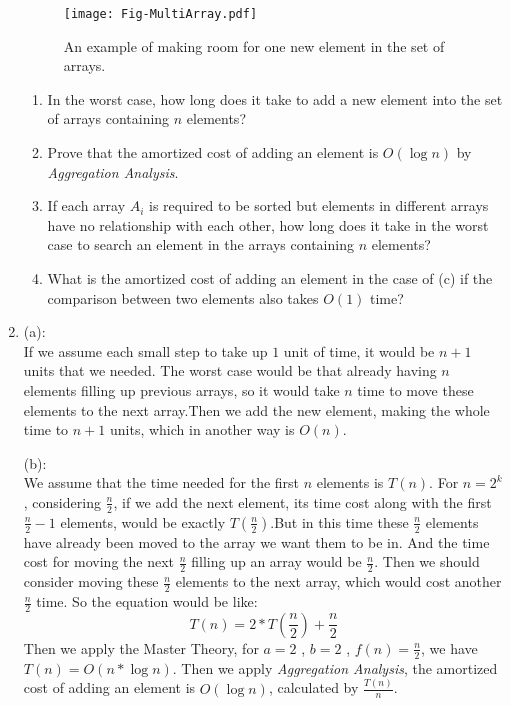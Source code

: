 \documentclass[12pt,a4paper]{article}
\makeatletter
\newtheorem*{solution}{Solution}
\theoremstyle{definition}
\renewenvironment{solution}[1][Solution] {\par\pushQED{\qed}\normalfont\topsep6\p@\@plus6\p@\relax\trivlist\item[\hskip\labelsep\bfseries#1\@addpunct{.}]\ignorespaces}{\popQED\endtrivlist\@endpefalse} \makeatother
\makeatother
\begin{document}
\begin{enumerate}
	\begin{figure}[!htbp]
	\centering
	\texttt{[image: Fig-MultiArray.pdf]}
	\caption{An example of making room for one new element in the set of arrays.}
	\label{Fig-MultiArray}
	\end{figure}

    \begin{enumerate}
        \item In the worst case, how long does it take to add a new element into the set of arrays containing $n$ elements?
        \item Prove that the amortized cost of adding an element is $O(\log n)$ by \emph{Aggregation Analysis}.
        \item If each array $A_i$ is required to be sorted but elements in different arrays have no relationship with each other, how long does it take in the worst case to search an element in the arrays containing $n$ elements? 
\item What is the amortized cost of adding an element in the case of (c) if the comparison between two elements also takes $O(1)$ time?
    \end{enumerate}
	
	\begin{solution}
	(a):\\
	If we assume each small step to take up $1$ unit of time, it would be $n+1$ units that we needed. The worst case would be that already having $n$ elements filling up previous arrays, so it would take $n$ time to move these elements to the next array.Then we add the new element, making the whole time to $n+1$ units, which in another way is $O\left(n\right)$.
	
	
	(b):\\
	We assume that the time needed for the first $n$ elements is $T\left(n\right)$. For $n=2^k$, considering $\frac{n}{2}$, if we add the next element, its time cost along with the first $\frac{n}{2} -1$ elements,  would be exactly $T\left( \frac{n}{2} \right)$.But in this time these $\frac{n}{2}$ elements have already been moved to the array we want them to be in. And the time cost for moving the next $\frac{n}{2}$ filling up an array would be $\frac{n}{2}$. Then we should consider moving these $\frac{n}{2}$ elements to the next array, which would cost another $\frac{n}{2}$ time. So the equation would be like:\\
	\begin{equation}
	    T\left( n \right) = 2* T\left( \frac{n}{2} \right) +\frac{n}{2}
	\end{equation}
	Then we apply the Master Theory, for $a=2$ , $b=2$ , $f\left(n\right)=\frac{n}{2}$, we have $T\left( n \right)= O\left(n*\log n\right)$. Then we apply \emph{Aggregation Analysis}, the amortized cost of adding an element is $O(\log n)$, calculated by $\frac{ T\left(n\right) }{n}$.
	

\end{solution}
\end{enumerate}
\end{document}
